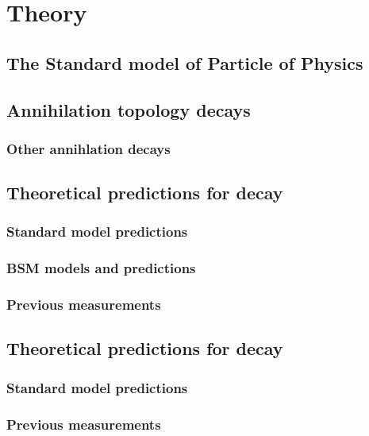 \chapter{Theory} 
\label{ch:theory}

\minitoc





\section{The Standard model of Particle of Physics}

\section{Annihilation topology decays}
\subsection{Other annihlation decays}





\section{Theoretical predictions for \decay{\Bp}{\Dsp\phiz} decay}
\subsection{Standard model predictions}
\subsection{BSM models and predictions}
\subsection{Previous measurements}

\section{Theoretical predictions for \decay{\Bp}{\Dsp\Kp\Km} decay}
\subsection{Standard model predictions}
\subsection{Previous measurements}




